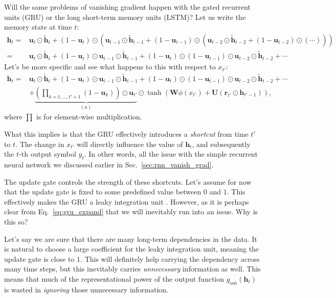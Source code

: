 \documentclass{report}
\newcommand{\vect}[1]{\mathbf{#1}}
\newcommand{\matr}[1]{\mathbf{#1}}
\newcommand{\vh}[0]{\vect{h}}
\newcommand{\vu}[0]{\vect{u}}
\newcommand{\vr}[0]{\vect{r}}
\newcommand{\mW}[0]{\matr{W}}
\newcommand{\mU}[0]{\matr{U}}
\begin{document}
Will the same problems of vanishing gradient happen with the gated recurrent
units (GRU) or the long short-term memory units (LSTM)? Let us write the memory 
state at time $t$:
\begin{align*}
    \vh_t =& \vu_t \odot \tilde{\vh}_t + 
    (1 - \vu_t) \odot \left(
        \vu_{t-1} \odot \tilde{\vh}_{t-1} + 
        (1 - \vu_{t-1}) \odot \left(
            \vu_{t-2} \odot \tilde{\vh}_{t-2} + 
            (1 - \vu_{t-2}) \odot \left(
                \cdots
            \right)
        \right)
    \right) 
    \\
    =& \vu_t \odot \tilde{\vh}_t +
    (1-\vu_t) \odot \vu_{t-1} \odot \tilde{\vh}_{t-1} +
    (1-\vu_t) \odot (1-\vu_{t-1}) \odot \vu_{t-2} \odot \tilde{\vh}_{t-2} +
    \cdots
\end{align*}
Let's be more specific and see what happens to this with respect to $x_{t'}$:
\begin{align}
    \vh_t =& \vu_t \odot \tilde{\vh}_t +
    (1-\vu_t) \odot \vu_{t-1} \odot \tilde{\vh}_{t-1} +
    (1-\vu_t) \odot (1-\vu_{t-1}) \odot \vu_{t-2} \odot \tilde{\vh}_{t-2} +
    \cdots 
    \nonumber \\
    \label{eq:gru_expand}
    & +
    \underbrace{
        \left(\prod_{k=t,\ldots,t'+1} (1-\vu_k)\right) \odot \vu_{t'} 
    }_{(a)}
    \odot \tanh \left( \mW \phi(x_{t'}) + \mU \left( \vr_{t'} \odot \vh_{t'-1} \right)
    \right),
\end{align}
where $\prod$ is for element-wise multiplication.

What this implies is that the GRU effectively introduces a {\em shortcut} from
time $t'$ to $t$. The change in $x_{t'}$ will directly influence the value of
$\vh_t$, and subsequently the $t$-th output symbol $y_t$. In other words, all
the issue with the simple recurrent neural network we discussed earlier in
Sec.~\ref{sec:rnn_vanish_grad}.

The update gate controls the strength of these shortcuts. Let's assume for now
that the update gate is fixed to some predefined value between $0$ and $1$. This
effectively makes the GRU a leaky integration unit \citep{bengio2013advances}.
However, as it is perhaps clear from Eq.~\eqref{eq:gru_expand} that we will
inevitably run into an issue. Why is this so? 

Let's say we are sure that there are many long-term dependencies in the data.
It is natural to choose a large coefficient for the leaky integration unit,
meaning the update gate is close to $1$. This will definitely help carrying the
dependency across many time steps, but this inevitably carries {\em unnecessary}
information as well. This means that much of the representational power of the
output function $g_{\text{out}}(\vh_t)$ is wasted in {\em ignoring} those
unnecessary information.
\end{document}
